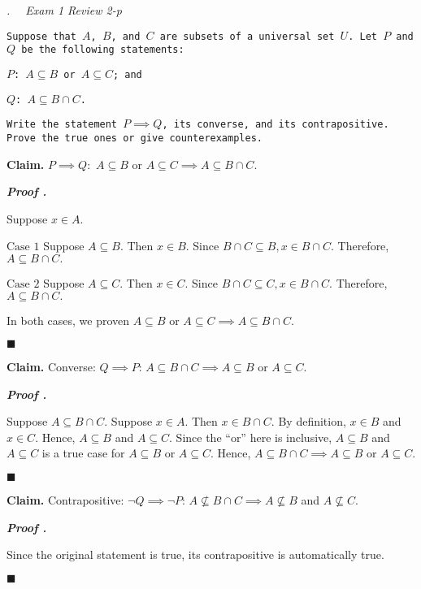 \documentclass[11pt,letter]{article}
\newcounter{nq}[section]
\newcounter{np}[section]
\newenvironment*{p}{\par\noindent\textbf{\textit{Proof \stepcounter{np}\thenp. }}\par}{\par\hfill $\blacksquare$\par}
\newenvironment*{q}[1]{\noindent\emph{\thesection.\stepcounter{nq}\thenq$\quad $ #1}\par\noindent\texttt}{}
\newenvironment*{clm}{\par\noindent\textbf{Claim. }}{\par}
\begin{document}
\begin{framed}\begin{q}
	{Exam 1 Review 2-p}
	{Suppose that $A$, $B$, and $C$ are subsets of a universal set $U$. Let $P$ and $Q$ be the following statements:}\par\hspace{5mm}\texttt{$P$: $A\subseteq B$ or $A\subseteq C$; and}\par\hspace{5mm}\texttt{$Q$: $A\subseteq B\cap C$.}\par\noindent\texttt{Write the statement $P\implies Q$, its converse, and its contrapositive. Prove the true ones or give counterexamples.}
\end{q}\end{framed}
\begin{clm}
	$P\implies Q:$ $A\subseteq B$ or $A\subseteq C\implies A\subseteq B\cap C.$
\end{clm}
\begin{p}
	Suppose $x\in A.$\par 
	$\boxed{\text{Case }1}$ Suppose $A\subseteq B.$ Then $x\in B.$ Since $B\cap C\subseteq B, x\in B\cap C.$ Therefore, $A\subseteq B\cap C.$\par 
	$\boxed{\text{Case }2}$ Suppose $A\subseteq C.$ Then $x\in C.$ Since $B\cap C\subseteq C,x\in B\cap C.$ Therefore, $A\subseteq B\cap C.$\par 
	In both cases, we proven $A\subseteq B$ or $A\subseteq C\implies A\subseteq B\cap C.$
\end{p}
\begin{clm}
	Converse: $Q\implies P$: $A\subseteq B\cap C\implies A\subseteq B$ or $A\subseteq C.$
\end{clm}
\begin{p}
	Suppose $A\subseteq B\cap C.$ Suppose $x\in A.$ Then $x\in B\cap C.$ By definition, $x\in B$ and $x\in C$. Hence, $A\subseteq B$ and $A\subseteq C.$ Since the ``or'' here is inclusive, $A\subseteq B$ and $A\subseteq C$ is a true case for $A\subseteq B$ or $A\subseteq C.$ Hence, $A\subseteq B\cap C\implies A\subseteq B$ or $A\subseteq C.$
\end{p}
\begin{clm}
	Contrapositive: $\neg Q\implies\neg P$: $A\nsubseteq B\cap C\implies A\nsubseteq B$ and $A\nsubseteq C.$	
\end{clm}
\begin{p}
	Since the original statement is true, its contrapositive is automatically true.
\end{p}
\end{document}
